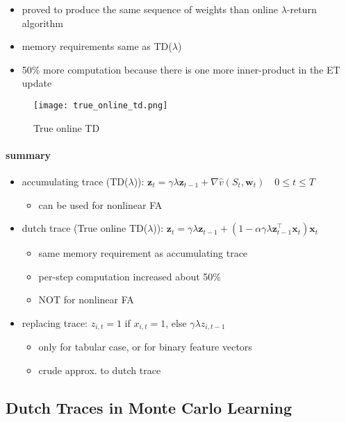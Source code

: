 \documentclass[sutton_barto_notes.tex]{subfiles}
\begin{document}
\begin{itemize}
\item proved to produce the same sequence of weights than online $\lambda$-return algorithm 
\item memory requirements same as TD($\lambda$) 
\item 50\% more computation because there is one more inner-product in the ET update 
\end{itemize}
\begin{figure}[h!]
    \centering
     \texttt{[image: true\_online\_td.png]}
    \caption{ True online TD }
\end{figure}

\paragraph{summary}
\begin{itemize}
\item accumulating trace (TD($\lambda$)): $\mathbf{z}_t = \gamma \lambda \mathbf{z}_{t-1} + \nabla \hat{v}(S_t, \mathbf{w}_t) \quad 0 \leq t \leq T$
\begin{itemize}
	\item can be used for nonlinear FA
\end{itemize}
\item dutch trace (True online TD($\lambda$)): $\mathbf{z}_t = \gamma \lambda \mathbf{z}_{t-1} + (1 - \alpha \gamma \lambda \mathbf{z}_{t-1}^{\top} \mathbf{x}_t) \mathbf{x}_t$
\begin{itemize}
	\item same memory requirement as accumulating trace
	\item per-step computation increased about 50\%
	\item NOT for nonlinear FA
\end{itemize}
\item replacing trace: $z_{i,t} = 1$ if $x_{i,t} = 1$, else $\gamma\lambda z_{i,t-1}$
\begin{itemize}
	\item only for tabular case, or for binary feature vectors
	\item crude approx. to dutch trace
\end{itemize}
\end{itemize}

\subsection{Dutch Traces in Monte Carlo Learning}
\end{document}
